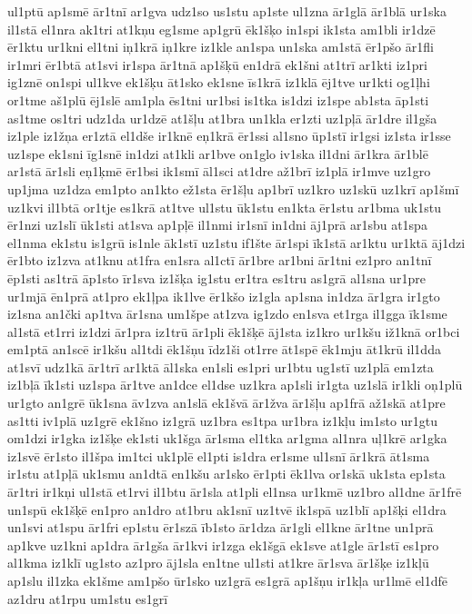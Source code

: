 {ul1ptū
ap1smē
ār1tnī
ar1gva
udz1so
us1stu
ap1ste
ul1zna
ār1glā
ār1blā
ur1ska
il1stā
el1nra
ak1tri
at1kņu
eg1sme
ap1grū
ēk1šķo
in1spi
ik1sta
am1bli
ir1dzē
ēr1ktu
ur1kni
el1tni
iņ1krā
iņ1kre
iz1kle
an1spa
un1ska
am1stā
ēr1pšo
ār1fli
ir1mri
ēr1btā
at1svi
ir1spa
ār1tnā
ap1šķū
en1drā
ek1šni
at1trī
ar1kti
iz1pri
ig1znē
on1spi
ul1kve
ek1šķu
āt1sko
ek1sne
īs1krā
iz1klā
ēj1tve
ur1kti
og1ļhi
or1tme
aš1plū
ēj1slē
am1pla
ēs1tni
ur1bsi
is1tka
is1dzi
iz1spe
ab1sta
āp1sti
as1tme
os1tri
udz1da
ur1dzē
at1šļu
at1bra
un1kla
er1zti
uz1pļā
ār1dre
il1gša
iz1ple
iz1žņa
er1ztā
el1dše
ir1knē
eņ1krā
ēr1ssi
al1sno
ūp1stī
ir1gsi
iz1sta
ir1sse
uz1spe
ek1sni
īg1snē
in1dzi
at1kli
ar1bve
on1glo
iv1ska
il1dni
ār1kra
ār1blē
ar1stā
ār1sli
eņ1ķmē
ēr1bsi
ik1smī
āl1sci
at1dre
až1brī
iz1plā
ir1mve
uz1gro
up1jma
uz1dza
em1pto
an1kto
ež1sta
ēr1šļu
ap1brī
uz1kro
uz1skū
uz1krī
ap1šmī
uz1kvi
il1btā
or1tje
es1krā
at1tve
ul1stu
ūk1stu
en1kta
ēr1stu
ar1bma
uk1stu
ēr1nzi
uz1slī
ūk1sti
at1sva
ap1pļē
il1nmi
ir1snī
in1dni
āj1prā
ar1sbu
at1spa
el1nma
ek1stu
is1grū
is1nle
āk1stī
uz1stu
if1šte
ār1spi
īk1stā
ar1ktu
ur1ktā
āj1dzi
ēr1bto
iz1zva
at1knu
at1fra
en1sra
al1ctī
ār1bre
ar1bni
ār1tni
ez1pro
an1tnī
ēp1sti
as1trā
āp1sto
īr1sva
iz1šķa
ig1stu
er1tra
es1tru
as1grā
al1sna
ur1pre
ur1mjā
ēn1prā
at1pro
ek1ļpa
ik1lve
ēr1kšo
iz1gla
ap1sna
in1dza
ār1gra
ir1gto
iz1sna
an1čki
ap1tva
ār1sna
um1špe
at1zva
ig1zdo
en1sva
et1rga
il1gga
īk1sme
al1stā
et1rri
iz1dzi
ār1pra
iz1trū
ār1pli
ēk1šķē
āj1sta
iz1kro
ur1kšu
iž1knā
or1bci
em1ptā
an1scē
ir1kšu
al1tdi
ēk1šņu
īdz1ši
ot1rre
āt1spē
ēk1mju
āt1krū
il1dda
at1svī
udz1kā
ār1trī
ar1ktā
āl1ska
en1sli
es1pri
ur1btu
ug1stī
uz1plā
em1zta
iz1bļā
īk1sti
uz1spa
ār1tve
an1dce
el1dse
uz1kra
ap1sli
ir1gta
uz1slā
ir1kli
oņ1plū
ur1gto
an1grē
ūk1sna
āv1zva
an1slā
ek1švā
ār1žva
ār1šļu
ap1frā
až1skā
at1pre
as1tti
iv1plā
uz1grē
ek1šno
iz1grā
uz1bra
es1tpa
ur1bra
iz1kļu
im1sto
ur1gtu
om1dzi
ir1gka
iz1šķe
ek1sti
uk1šga
ār1sma
el1tka
ar1gma
al1nra
uļ1krē
ar1gka
iz1svē
ēr1sto
il1špa
im1tci
uk1plē
el1pti
is1dra
er1sme
ul1snī
ār1krā
āt1sma
ir1stu
at1pļā
uk1smu
an1dtā
en1kšu
ar1sko
ēr1pti
ēk1lva
or1skā
uk1sta
ep1sta
ār1tri
ir1kņi
ul1stā
et1rvi
il1btu
ār1sla
at1pli
el1nsa
ur1kmē
uz1bro
al1dne
ār1frē
un1spū
ek1šķē
en1pro
an1dro
at1bru
ak1snī
uz1tvē
ik1spā
uz1blī
ap1šķi
el1dra
un1svi
at1spu
ār1fri
ep1stu
ēr1szā
īb1sto
ār1dza
ār1gli
el1kne
ār1tne
un1prā
ap1kve
uz1kni
ap1dra
ār1gša
ār1kvi
ir1zga
ek1šgā
ek1sve
at1gle
ār1stī
es1pro
al1kma
iz1klī
ug1sto
az1pro
āj1sla
en1tne
ul1sti
at1kre
ār1sva
ār1šķe
iz1kļū
ap1slu
il1zka
ek1šme
am1pšo
ūr1sko
uz1grā
es1grā
ap1šņu
ir1kļa
ur1lmē
el1dfē
az1dru
at1rpu
um1stu
es1grī
}
